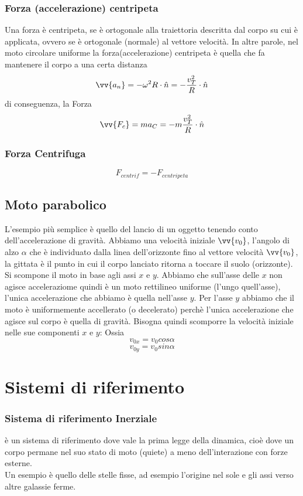 \documentclass[a4paper]{report}
\begin{document}
  \subsection{Forza (accelerazione) centripeta}
  Una forza è centripeta, se è ortogonale alla traiettoria descritta dal corpo su cui è applicata, ovvero se è ortogonale (normale) al vettore velocità. In altre parole, nel moto circolare uniforme la forza(accelerazione) centripeta è quella che fa mantenere il corpo a una certa distanza
  $$ \vv{a_n} = -\omega^2 R \cdot \hat{n} = -\frac{v_T^2}{R} \cdot \hat{n} $$
  di conseguenza, la Forza
  $$ \vv{F_c} = ma_C =  -m\frac{v_T^2}{R} \cdot \hat{n}$$

  \subsection{Forza Centrifuga}
  $$ F_{centrif} = - F_{centripeta} $$


  \section{Moto parabolico}
  L'esempio più semplice è quello del lancio di un oggetto tenendo conto dell'accelerazione di gravità. Abbiamo una velocità iniziale $\vv{v_0}$, l'angolo di alzo $\alpha$ che è individuato dalla linea dell'orizzonte fino al vettore velocità $\vv{v_0}$, la gittata è il punto in cui il corpo lanciato ritorna a toccare il suolo (orizzonte).\\
  Si scompone il moto in base agli assi $x$ e $y$. Abbiamo che sull'asse delle $x$ non agisce acceleraziome quindi è un moto rettilineo uniforme (l'ungo quell'asse), l'unica accelerazione che abbiamo è quella nell'asse $y$.
  Per l'asse $y$ abbiamo che il moto è uniformemente accellerato (o decelerato) perchè l'unica accelerazione che agisce sul corpo è quella di gravità.
  Bisogna quindi scomporre la velocità iniziale nelle sue componenti $x$ e $y$: Ossia
  $$v_{0x} = v_0 cos\alpha$$
  $$v_{0y} = v_0 sin\alpha$$


  \chapter{Sistemi di riferimento}
  \subsection{Sistema di riferimento Inerziale}
  è un sistema di riferimento dove vale la prima legge della dinamica, cioè dove un corpo permane nel suo stato di moto (quiete) a meno dell'interazione con forze esterne.\\
  Un esempio è quello delle stelle fisse, ad esempio l'origine nel sole e gli assi verso altre galassie ferme.
\end{document}
